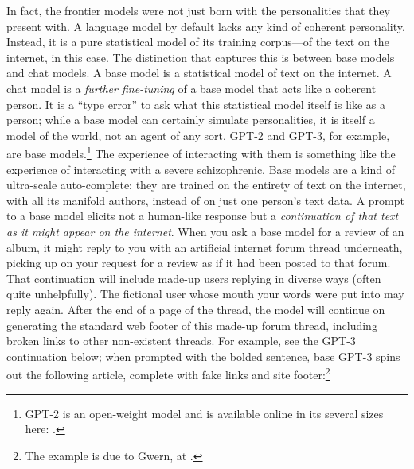 In fact, the frontier models were not just born with the personalities that
they present with. A language model by default lacks any kind of coherent
personality. Instead, it is a pure statistical model of its training
corpus---of the text on the internet, in this case. The distinction that
captures this is between base models and chat models. A base model is a
statistical model of text on the internet. A chat model is a \emph{further
fine-tuning} of a base model that acts like a coherent person. It is a ``type
error'' to ask what this statistical model itself is like as a person; while a
base model can certainly simulate personalities, it is itself a model of the
world, not an agent of any sort. GPT-2 and GPT-3, for example, are base
models.\footnote{GPT-2 is an open-weight model and is available online in its
several sizes here: .} The
experience of interacting with them is something like the experience of
interacting with a severe schizophrenic. Base models are a kind of ultra-scale
auto-complete: they are trained on the entirety of text on the internet, with
all its manifold authors, instead of on just one person's text data. A prompt
to a base model elicits not a human-like response but a \emph{continuation of
that text as it might appear on the internet}. When you ask a base model for a
review of an album, it might reply to you with an artificial internet forum
thread underneath, picking up on your request for a review as if it had been
posted to that forum. That continuation will include made-up users replying in
diverse ways (often quite unhelpfully). The fictional user whose mouth your
words were put into may reply again. After the end of a page of the thread, the
model will continue on generating the standard web footer of this made-up forum
thread, including broken links to other non-existent threads. For example, see
the GPT-3 continuation below; when prompted with the bolded sentence, base
GPT-3 spins out the following article, complete with fake links and site
footer:\footnote{The example is due to Gwern, at
.}


